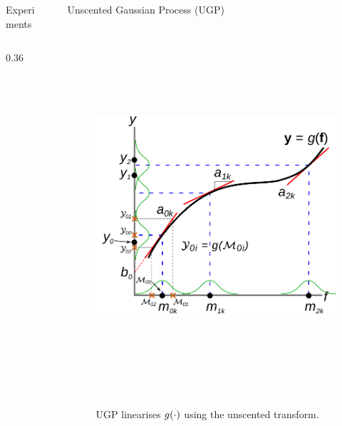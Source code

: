 \documentclass[final]{beamer}
\newlength{\sepwid}
\newlength{\onecolwid}
\newlength{\twocolwid}
\begin{document}
\begin{frame}[t]
\begin{columns}[t]
\begin{column}{\twocolwid}
\begin{columns}[t,totalwidth=\twocolwid]
\begin{column}{\twocolwid}
\begin{block}{Experiments}
\begin{columns}
\begin{column}{0.36\twocolwid}
\end{column}
%




\end{columns}
\end{block}


\end{column} %


\end{columns} %

\end{column} %

\begin{column}{\sepwid}\end{column} %

\begin{column}{\onecolwid} %

\begin{block}{Unscented Gaussian Process (UGP)}
%
\begin{figure}
    \includegraphics[height=14cm]{fig/statlin_gp}
 \caption{UGP linearises  $g\!\left({{\cdot}}\right)$ using the unscented transform.}
\end{figure}        


\end{block}
\end{column}
\end{columns}
\end{frame}
\end{document}
